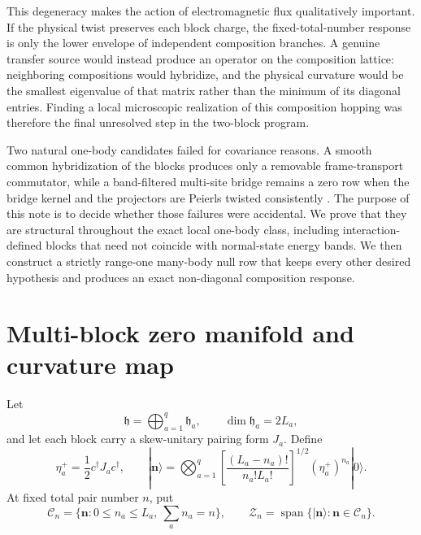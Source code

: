\documentclass[11pt]{article}
\theoremstyle{remark}
\newcommand{\cZ}{\mathcal Z}
\newcommand{\cC}{\mathcal C}
\newcommand{\Span}{\operatorname{span}}
\newcommand{\bn}{\mathbf n}
\begin{document}
This degeneracy makes the action of electromagnetic flux qualitatively
important.  If the physical twist preserves each block charge, the
fixed-total-number response is only the lower envelope of independent
composition branches.  A genuine transfer source would instead produce an
operator on the composition lattice: neighboring compositions would hybridize,
and the physical curvature would be the smallest eigenvalue of that matrix
rather than the minimum of its diagonal entries.  Finding a local microscopic
realization of this composition hopping was therefore the final unresolved
step in the two-block program.

Two natural one-body candidates failed for covariance reasons.  A smooth common
hybridization of the blocks produces only a removable frame-transport
commutator, while a band-filtered multi-site bridge remains a zero row when the
bridge kernel and the projectors are Peierls twisted consistently
\cite{TwoBlock2026}.  The purpose of this note is to decide whether those
failures were accidental.  We prove that they are structural throughout the
exact local one-body class, including interaction-defined blocks that need not
coincide with normal-state energy bands.  We then construct a strictly
range-one many-body null row that keeps every other desired hypothesis and
produces an exact non-diagonal composition response.

\section{Multi-block zero manifold and curvature map}

Let
\begin{equation}
 \mathfrak h=\bigoplus_{a=1}^q\mathfrak h_a,
 \qquad \dim\mathfrak h_a=2L_a,
 \label{eq:h-decomp}
\end{equation}
and let each block carry a skew-unitary pairing form $J_a$.  Define
\begin{equation}
 \eta_a^+=\frac12c^\dagger J_ac^\dagger,
 \qquad
 |\bn\rangle
 =\bigotimes_{a=1}^q
 \left[\frac{(L_a-n_a)!}{n_a!L_a!}\right]^{1/2}
 (\eta_a^+)^{n_a}|0\rangle.
 \label{eq:product-agp}
\end{equation}
At fixed total pair number $n$, put
\begin{equation}
 \cC_n=\{\bn:0\le n_a\le L_a,\ \sum_an_a=n\},
 \qquad
 \cZ_n=\Span\{|\bn\rangle:\bn\in\cC_n\}.
 \label{eq:zero-manifold}
\end{equation}
\end{document}
